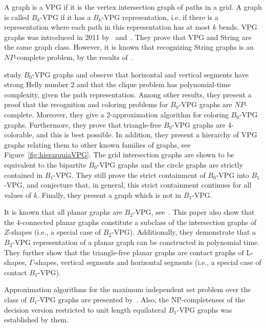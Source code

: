 A graph is a VPG if it is the vertex intersection graph of paths in a grid. A graph is called
$B_k$-VPG if it has a $B_k$-VPG representation, i.e. if there is a representation where each path in this representation has at most $k$ bends. VPG graphs was introduced in 2011 by~\citet{asinowski2011string} and~\citet{asinowski2012}. They prove that VPG and String are
the same graph class. However, it is known that  recognizing String graphs is an $NP$-complete problem, by the results of~\cite{schaefer2003recognizing, kratochvil1991string}.

\citet{asinowski2012} study $B_0$-VPG graphs and observe
that horizontal and vertical segments have strong Helly number 2 and that the clique problem has polynomial-time complexity, given the path representation. Among other results, they present a proof that the recognition and coloring problems for $B_0$-VPG graphs are $NP$-complete. Moreover, they  give a 2-approximation algorithm for coloring $B_0$-VPG graphs. Furthermore, they prove that triangle-free $B_0$-VPG graphs are 4-colorable, and this is best  possible. In addition, they present a hierarchy of VPG graphs relating them to other known families of graphs, see Figure~\ref{fig:hierarquiaVPG}. The grid intersection graphs are shown to be equivalent to the bipartite $B_0$-VPG graphs and the circle graphs are strictly contained in $B_1$-VPG. They still prove the strict containment of $B_0$-VPG into $B_1$-VPG, and conjecture that, in general, this strict containment continues for all values of $k$. Finally, they present
a graph which is not in $B_1$-VPG. 




It is known that all planar graphs are $B_2$-VPG, see~\cite{chaplick2012planar}. This paper also show that the 4-connected planar graphs constitute a subclass
of the intersection graphs of $Z$-shapes (i.e., a special case of $B_2$-VPG). Additionally, they demonstrate that a $B_2$-VPG representation of a planar
graph can be constructed in polynomial time. They further show that the triangle-free planar graphs are contact graphs of L-shapes, $\Gamma$-shapes, vertical segments and horizontal segments (i.e., a special case of contact $B_1$-VPG). 

Approximation algorithms for the maximum independent set problem over the class of $B_1$-VPG graphs are presented by~\citet{lahiri2015maximum}. Also, the NP-completeness of the decision version restricted to unit length equilateral   $B_1$-VPG graphs was established by them.

